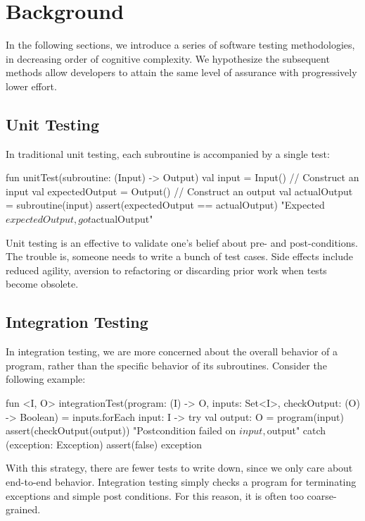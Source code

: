 \section{Background}

In the following sections, we introduce a series of software testing methodologies, in decreasing order of cognitive complexity. We hypothesize the subsequent methods allow developers to attain the same level of assurance with progressively lower effort.

\subsection{Unit Testing}

\noindent In traditional unit testing, each subroutine is accompanied by a single test:
%
\begin{kotlinlisting}
fun unitTest(subroutine: (Input) -> Output) {
    val input = Input() // Construct an input
    val expectedOutput = Output() // Construct an output
    val actualOutput = subroutine(input)
    assert(expectedOutput == actualOutput) { "Expected $expectedOutput, got $actualOutput" }
}
\end{kotlinlisting}
%
Unit testing is an effective to validate one's belief about pre- and post-conditions. The trouble is, someone needs to write a bunch of test cases. Side effects include reduced agility, aversion to refactoring or discarding prior work when tests become obsolete.

\subsection{Integration Testing}

\noindent In integration testing, we are more concerned about the overall behavior of a program, rather than the specific behavior of its subroutines. Consider the following example:

\begin{kotlinlisting}
fun <I, O> integrationTest(program: (I) -> O, inputs: Set<I>, checkOutput: (O) -> Boolean) =
    inputs.forEach { input: I ->
        try {
            val output: O = program(input)
            assert(checkOutput(output)) { "Postcondition failed on $input, $output" }
        } catch (exception: Exception) {
            assert(false) { exception }
        }
    }
\end{kotlinlisting}
%
With this strategy, there are fewer tests to write down, since we only care about end-to-end behavior. Integration testing simply checks a program for terminating exceptions and simple post conditions. For this reason, it is often too coarse-grained.

